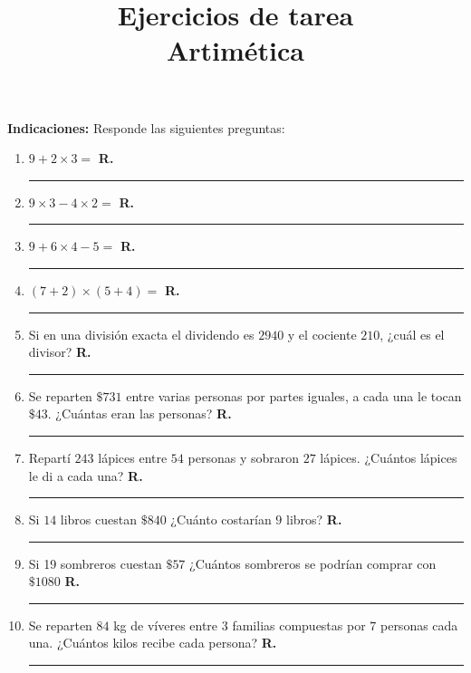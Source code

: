 

\title{Ejercicios de tarea \\ {\Large Artimética}\vspace{-3ex}}
\author{}
\date{ }



\maketitle
\fontsize{14}{14}\selectfont

\textbf{Indicaciones: } Responde las siguientes preguntas:

\begin{enumerate}
\item $9 + 2 \times 3 =$ \hspace{0.3cm} \textbf{R.} \rule{3cm}{0.1mm}
\item $9 \times 3 - 4 \times 2 =$ \hspace{0.3cm} \textbf{R.} \rule{3cm}{0.1mm}
\item $9 + 6 \times 4 - 5 =$ \hspace{0.3cm} \textbf{R.} \rule{3cm}{0.1mm}
\item $(7 + 2) \times (5 + 4) =$ \hspace{0.3cm} \textbf{R.} \rule{3cm}{0.1mm}
\item Si en una división exacta el dividendo es $2940$ y el cociente $210$, ¿cuál es el divisor? \hspace{0.3cm} \textbf{R.} \rule{3cm}{0.1mm}
\item Se reparten $\$731$ entre varias personas por partes iguales, a cada una le tocan $\$43$. ¿Cuántas eran las personas?  \hspace{0.3cm} \textbf{R.} \rule{3cm}{0.1mm}
\item Repartí $243$ lápices entre $54$ personas y sobraron $27$ lápices. ¿Cuántos lápices le di a cada una? \hspace{0.3cm} \textbf{R.} \rule{3cm}{0.1mm}
\item Si $14$ libros cuestan $\$840$ ¿Cuánto costarían $9$ libros? \hspace{0.3cm} \textbf{R.} \rule{3cm}{0.1mm}
\item Si 19 sombreros cuestan $\$57$ ¿Cuántos sombreros se podrían comprar con $\$1080$  \hspace{0.3cm} \textbf{R.} \rule{3cm}{0.1mm}
\item Se reparten $84$ kg de víveres entre $3$ familias compuestas por $7$ personas cada una. ¿Cuántos kilos recibe cada persona? \hspace{0.3cm} \textbf{R.} \rule{3cm}{0.1mm}
\end{enumerate}


